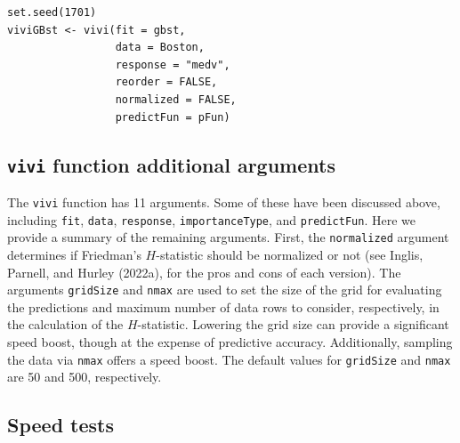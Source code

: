 \begin{verbatim}
set.seed(1701) 
viviGBst <- vivi(fit = gbst,
                 data = Boston,
                 response = "medv",
                 reorder = FALSE,
                 normalized = FALSE,
                 predictFun = pFun)
\end{verbatim}

\hypertarget{sec:vivimatarg}{%
\subsection{\texorpdfstring{\texttt{vivi} function additional arguments}{vivi function additional arguments}}\label{sec:vivimatarg}}

The \texttt{vivi} function has 11 arguments. Some of these have been discussed above, including \texttt{fit}, \texttt{data}, \texttt{response}, \texttt{importanceType}, and \texttt{predictFun}. Here we provide a summary of the remaining arguments. First, the \texttt{normalized} argument determines if Friedman's \(H\)-statistic should be normalized or not (see Inglis, Parnell, and Hurley (2022a), for the pros and cons of each version). The arguments \texttt{gridSize} and \texttt{nmax} are used to set the size of the grid for evaluating the predictions and maximum number of data rows to consider, respectively, in the calculation of the \(H\)-statistic. Lowering the grid size can provide a significant speed boost, though at the expense of predictive accuracy. Additionally, sampling the data via \texttt{nmax} offers a speed boost. The default values for \texttt{gridSize} and \texttt{nmax} are 50 and 500, respectively.

\hypertarget{sec:speed}{%
\subsection{Speed tests}\label{sec:speed}}

